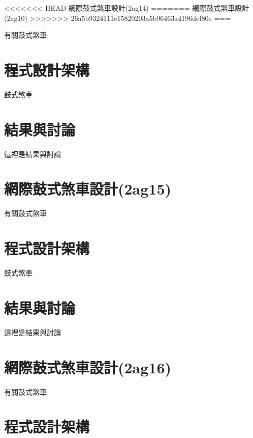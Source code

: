 \documentclass[]{article}
\begin{document}
\textless{}\textless{}\textless{}\textless{}\textless{}\textless{}\textless{}
HEAD 網際鼓式煞車設計(2ag14) ======= 網際鼓式煞車設計(2ag10)
\textgreater{}\textgreater{}\textgreater{}\textgreater{}\textgreater{}\textgreater{}\textgreater{}
26a5b9324111e15820203a5b96463a4196def80e ===

有關鼓式煞車

\section{程式設計架構}\label{ux7a0bux5f0fux8a2dux8a08ux67b6ux69cb-8}

鼓式煞車

\section{結果與討論}\label{ux7d50ux679cux8207ux8a0eux8ad6-8}

這裡是結果與討論

\section{網際鼓式煞車設計(2ag15)}\label{ux7db2ux969bux9f13ux5f0fux715eux8ecaux8a2dux8a082ag15}

有關鼓式煞車

\section{程式設計架構}\label{ux7a0bux5f0fux8a2dux8a08ux67b6ux69cb-9}

鼓式煞車

\section{結果與討論}\label{ux7d50ux679cux8207ux8a0eux8ad6-9}

這裡是結果與討論

\section{網際鼓式煞車設計(2ag16)}\label{ux7db2ux969bux9f13ux5f0fux715eux8ecaux8a2dux8a082ag16}

有關鼓式煞車

\section{程式設計架構}\label{ux7a0bux5f0fux8a2dux8a08ux67b6ux69cb-10}
\end{document}
